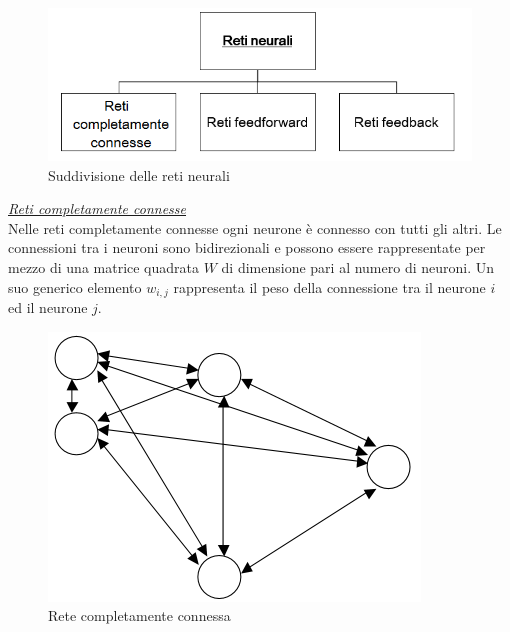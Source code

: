 \documentclass[12pt,a4paper,oneside]{book}
\begin{document}
		\begin{figure}[h]
			\centering
			\includegraphics[width=0.75\linewidth]{IMMAGINI/diagrammareti}
			\caption{ Suddivisione delle reti neurali}
			\label{fig:diagrammareti}
		\end{figure}
		
		\underline{\emph{Reti completamente connesse}}\\
		Nelle reti completamente connesse ogni neurone è connesso con tutti gli altri. Le connessioni tra i neuroni sono bidirezionali e possono essere rappresentate per mezzo di una matrice quadrata $W$ di dimensione pari al numero di neuroni. Un suo generico elemento $w_{i,j}$ rappresenta il peso della connessione tra il neurone $i$ ed il neurone $j$.  
		
		\begin{figure}[h!]
			\centering
			\includegraphics[width=0.5\linewidth]{IMMAGINI/completamenteconnesssa}
			\caption{ Rete completamente connessa}
			\label{fig:completamenteconnesssa}
		\end{figure}
		
\end{document}
